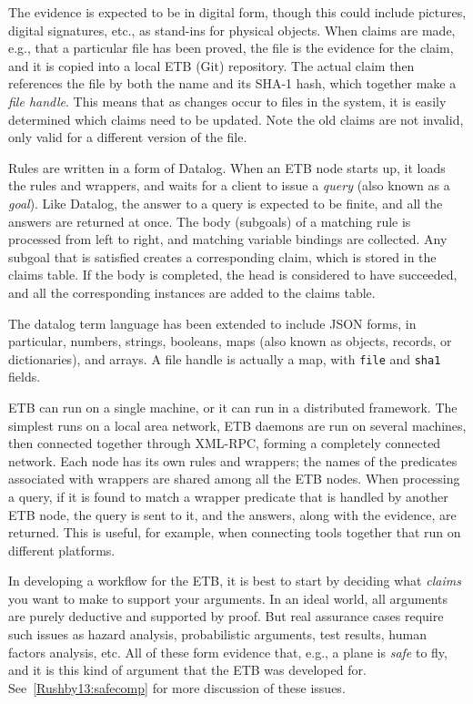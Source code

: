 \documentclass{report}
\begin{document}
The evidence is expected to be in digital form, though this could include
pictures, digital signatures, etc., as stand-ins for physical objects.
When claims are made, e.g., that a particular file has been proved, the
file is the evidence for the claim, and it is copied into a local ETB (Git)
repository.  The actual claim then references the file by both the name
and its SHA-1 hash, which together make a \emph{file handle}.  This means
that as changes occur to files in the system, it is easily determined
which claims need to be updated.  Note the old claims are not invalid,
only valid for a different version of the file.

Rules are written in a form of Datalog.  When an ETB node starts up, it
loads the rules and wrappers, and waits for a client to issue a
\emph{query} (also known as a \emph{goal}).  Like Datalog, the answer to a
query is expected to be finite, and all the answers are returned at once.
The body (subgoals) of a matching rule is processed from left to right,
and matching variable bindings are collected.  Any subgoal that is
satisfied creates a corresponding claim, which is stored in the claims
table.  If the body is completed, the head is considered to have
succeeded, and all the corresponding instances are added to the claims
table.

The datalog term language has been extended to include JSON forms, in
particular, numbers, strings, booleans, maps (also known as objects,
records, or dictionaries), and arrays.  A file handle is actually a map,
with \texttt{file} and \texttt{sha1} fields.

ETB can run on a single machine, or it can run in a distributed framework.
The simplest runs on a local area network, ETB daemons are run on several
machines, then connected together through XML-RPC, forming a completely
connected network.  Each node has its own rules and wrappers; the
names of the predicates associated with wrappers are shared among all the
ETB nodes.  When processing a query, if it is found to match a wrapper
predicate that is handled by another ETB node, the query is sent to it,
and the answers, along with the evidence, are returned.  This is useful,
for example, when connecting tools together that run on different
platforms.

In developing a workflow for the ETB, it is best to start by deciding what
\emph{claims} you want to make to support your arguments.  In an ideal
world, all arguments are purely deductive and supported by proof.  But
real assurance cases require such issues as hazard analysis, probabilistic
arguments, test results, human factors analysis, etc.  All of these form
evidence that, e.g., a plane is \emph{safe} to fly, and it is this kind of
argument that the ETB was developed for.  See~\ref{Rushby13:safecomp} for
more discussion of these issues.
\end{document}
